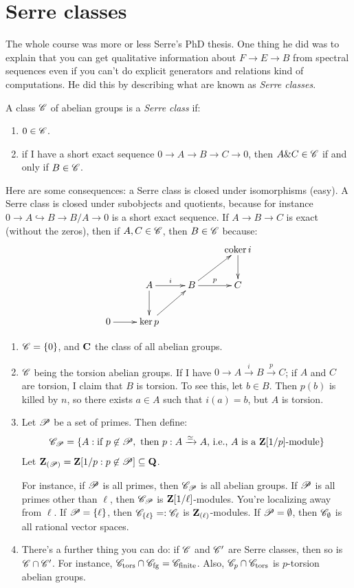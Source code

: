 \section{Serre classes}
The whole course was more or less Serre's PhD thesis.
One thing he did was to explain that you can get qualitative information about $F\to E\to B$ from spectral sequences even if you can't do explicit generators and relations kind of computations.
He did this by describing what are known as \emph{Serre classes}.
\begin{definition}
    A class $\mathscr C$ of abelian groups is a \emph{Serre class} if:
    \begin{enumerate}
	\setcounter{enumi}{0}
	\item $0\in \mathscr C$.
	\item if I have a short exact sequence $0\to A\to B\to C\to 0$, then $A\& C\in \mathscr C$ if and only if $B\in\mathscr C$.
    \end{enumerate}
\end{definition}
Here are some consequences:
a Serre class is closed under isomorphisms (easy).
A Serre class is closed under subobjects and quotients, because for instance $0\to A\hookrightarrow B \to B/A\to 0$ is a short exact sequence.
If $A\to B\to C$ is exact (without the zeros), then if $A,C\in \mathscr C$, then $B\in \mathscr C$ because:
$$
\xymatrix{
    & & & \coker i\ar[d]\\
    & A\ar[r]^i\ar[d] & B\ar[r]^p\ar[ur] & C\\
    0\ar[r] & \ker p\ar[ur] & &
}
$$
\begin{example}
    \begin{enumerate}
	\item $\mathscr C = \{0\}$, and $\mathbf C$ the class of all abelian groups.
	\item $\mathscr C$ being the torsion abelian groups.
	    If I have $0\to A\xrightarrow{i} B\xrightarrow{p} C$; if $A$ and $C$ are torsion, I claim that $B$ is torsion.
	    To see this, let $b\in B$.
	    Then $p(b)$ is killed by $n$, so there exists $a\in A$ such that $i(a) = b$, but $A$ is torsion.
	\item Let $\mathscr P$ be a set of primes.
	    Then define:
	    $$
	    \mathscr C_{\mathscr P} = \{ A : \text{if }p\not\in\mathscr P,\text{ then }p:A\xrightarrow{\simeq} A\text{, i.e., }A \text{ is a } \mathbf Z[1/p]\text{-module}\}
	    $$
	    Let $\mathbf Z_{(\mathscr P)} = \mathbf Z[1/p: p\not\in\mathscr P]\subseteq\mathbf Q$.
	    
	    For instance, if $\mathscr P$ is all primes, then $\mathscr C_\mathscr P$ is all abelian groups.
	    If $\mathscr P$ is all primes other than $\ell$, then $\mathscr C_\mathscr P$ is $\mathbf Z[1/\ell]$-modules.
	    You're localizing away from $\ell$.
	    If $\mathscr P = \{\ell\}$, then $\mathscr C_{\{\ell\}} =:\mathscr C_\ell$ is $\mathbf Z_{(\ell)}$-modules.
	    If $\mathscr P = \emptyset$, then $\mathscr C_\emptyset$ is all rational vector spaces.
	\item There's a further thing you can do: 
	    if $\mathscr C$ and $\mathscr C^\prime$ are Serre classes, then so is $\mathscr C\cap \mathscr C^\prime$.
	    For instance, $\mathscr C_\text{tors} \cap \mathscr C_\text{fg} = \mathscr C_\text{finite}$.
	    Also, $\mathscr C_p \cap \mathscr C_\text{tors}$ is $p$-torsion abelian groups.
    \end{enumerate}
\end{example}
